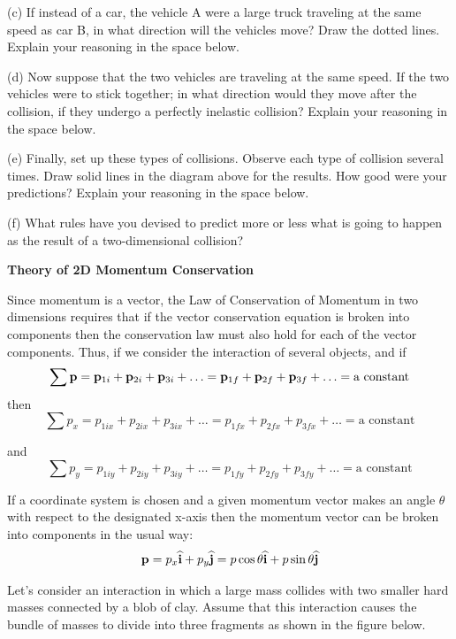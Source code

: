 (c) If instead of a car, the vehicle A were a large truck traveling at the same
speed as car B, in what direction will the vehicles move? Draw the dotted lines.
Explain your reasoning in the space below.
\vspace{20mm}

(d) Now suppose that the two vehicles are traveling at the same speed. If the
two vehicles were to stick together; in what direction would they move after
the collision, if they undergo a perfectly inelastic collision? Explain your
reasoning in the space below.
\vspace{20mm}

(e) Finally, set up these types of collisions. Observe each type of collision
several times. Draw solid lines in the diagram above for the results. How good
were your predictions? Explain your reasoning in the space below.
\vspace{20mm}

(f) What rules have you devised to predict more or less what is going to happen
as the result of a two-dimensional collision?
\vspace{20mm}

\textbf{Theory of 2D Momentum Conservation }

Since momentum is a vector, the Law of Conservation of Momentum in two dimensions
requires that if the vector conservation equation is broken into components
then the conservation law must also hold for each of the vector components.
Thus, if we consider the interaction of several objects, and if 
\[
\sum {\bf p}={{\bf p}_{1i}}+{{\bf p}_{2i}}+{{\bf p}_{3i}}+\ldots ={{\bf p}_{1f}}+{{\bf p}_{2f}}+{{\bf p}_{3f}}+\ldots =\mbox{a constant}\]
then
\[
\sum p_{x}=p_{1ix}+p_{2ix}+p_{3ix}+\ldots =p_{1fx}+p_{2fx}+p_{3fx}+\ldots =
\mbox{a constant}\]


and
\[
\sum p_{y}=p_{1iy}+p_{2iy}+p_{3iy}+\ldots =p_{1fy}+p_{2fy}+p_{3fy}+\ldots =
\mbox{a constant}\]


If a coordinate system is chosen and a given momentum vector makes an angle
\( \theta  \) with respect to the designated x-axis then the momentum vector
can be broken into components in the usual way:
\[
{\bf p}=p_{x}\widehat{\bf i}+p_{y}\widehat{\bf j}=p\cos \theta \widehat{\bf i}+
p\sin \theta \widehat{\bf j}\]


Let's consider an interaction in which a large mass collides with two smaller
hard masses connected by a blob of clay. Assume that this interaction causes
the bundle of masses to divide into three fragments as shown in the figure below.

